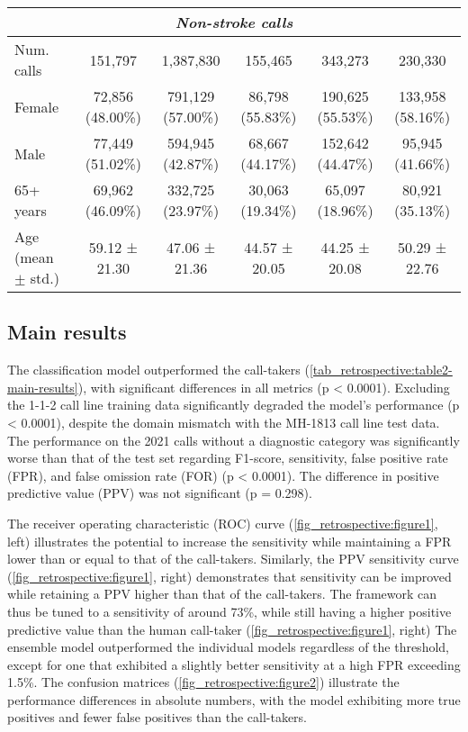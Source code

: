 {\begin{table}[t]
{\begin{tabular}{l|ccccc}
        \midrule
        \multicolumn{6}{c}{\emph{Non-stroke calls}} \\
        \midrule
        Num. calls            & 151,797 & 1,387,830 & 155,465 & 343,273 & 230,330 \\
        Female                & 72,856 (48.00\%) & 791,129 (57.00\%) & 86,798 (55.83\%) & 190,625 (55.53\%) & 133,958 (58.16\%) \\
        Male                  & 77,449 (51.02\%) & 594,945 (42.87\%) & 68,667 (44.17\%) & 152,642 (44.47\%) & 95,945 (41.66\%) \\
        65+ years             & 69,962 (46.09\%) & 332,725 (23.97\%) & 30,063 (19.34\%) & 65,097 (18.96\%) & 80,921 (35.13\%) \\
        Age (mean $\pm$ std.) & 59.12 ± 21.30 & 47.06 ± 21.36 & 44.57 ± 20.05 & 44.25 ± 20.08 & 50.29 ± 22.76 \\

        \bottomrule
    \end{tabular}%
    }
\end{table}

\subsection{Main results}

The classification model outperformed the call-takers (\cref{tab_retrospective:table2-main-results}), with significant differences in all metrics (p < 0.0001). Excluding the 1-1-2 call line training data significantly degraded the model's performance (p < 0.0001), despite the domain mismatch with the MH-1813 call line test data. The performance on the 2021 calls without a diagnostic category was significantly worse than that of the test set regarding F1-score, sensitivity, false positive rate (FPR), and false omission rate (FOR) (p < 0.0001). The difference in positive predictive value (PPV) was not significant (p = 0.298).

The receiver operating characteristic (ROC) curve (\cref{fig_retrospective:figure1}, left) illustrates the potential to increase the sensitivity while maintaining a FPR lower than or equal to that of the call-takers. Similarly, the PPV sensitivity curve (\cref{fig_retrospective:figure1}, right) demonstrates that sensitivity can be improved while retaining a PPV higher than that of the call-takers. The framework can thus be tuned to a sensitivity of around 73\%, while still having a higher positive predictive value than the human call-taker (\cref{fig_retrospective:figure1}, right) The ensemble model outperformed the individual models regardless of the threshold, except for one that exhibited a slightly better sensitivity at a high FPR exceeding 1.5\%. The confusion matrices (\cref{fig_retrospective:figure2}) illustrate the performance differences in absolute numbers, with the model exhibiting more true positives and fewer false positives than the call-takers.

}

